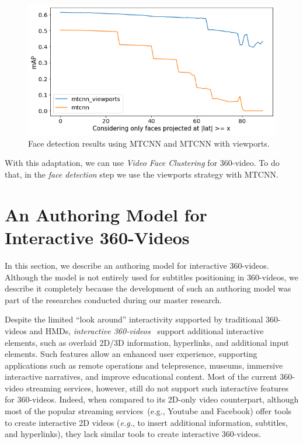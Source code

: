 \begin{figure}[!ht]
    \centering
    \includegraphics[width=0.8\linewidth]{img/video360/results_360_detection.png}
    \caption{Face detection results using MTCNN and MTCNN with viewports.}
    \label{fig:results_360_detection}
\end{figure}

With this adaptation, we can use \emph{Video Face Clustering} for 360-video. To do that, in the \emph{face detection} step we use the viewports strategy with MTCNN. 


\section{An Authoring Model for Interactive 360-Videos}
\label{sec:authoring_model}

In this section, we describe an authoring model for interactive 360-videos. Although the model is not entirely used for subtitles positioning in 360-videos, we describe it completely because the development of such an authoring model was part of the researches conducted during our master research.

Despite the limited ``look around'' interactivity supported by traditional 360-videos and HMDs, \emph{interactive 360-videos}~\cite{chambel2011,berning2013parnorama} support additional interactive elements, such as overlaid 2D/3D information, hyperlinks, and additional input elements.
Such features allow an enhanced user experience, supporting applications such as remote operations and telepresence, museums, immersive interactive narratives, and improve educational content.
Most of the current 360-video streaming services, however, still do not support such interactive features for 360-videos.
Indeed, when compared to its 2D-only video counterpart, although most of the popular streaming services~(e.g., Youtube and Facebook) offer tools to create interactive 2D videos (\emph{e.g.}, to insert additional information, subtitles, and hyperlinks), they lack similar tools to create interactive 360-videos.

